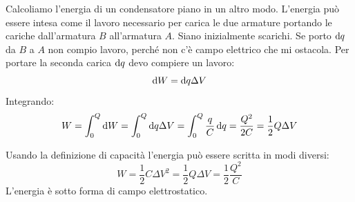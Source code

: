 \begin{Es}
Calcoliamo l'energia di un condensatore piano in un altro modo. L'energia può essere intesa come il lavoro necessario per carica le due armature portando le cariche dall'armatura $B$ all'armatura $A$. Siano inizialmente scarichi. Se porto $\mathrm{d} q$ da $B$ a $A$ non compio lavoro, perché non c'è campo elettrico che mi ostacola. Per portare la seconda carica $\mathrm{d} q$ devo compiere un lavoro:
\begin{equation*}\mathrm{d} W=\mathrm{d} q\Delta V\end{equation*}
Integrando:
\begin{equation*}W=\int_0^Q\mathrm{d} W=\int_0^Q\mathrm{d} q\Delta V=\int_0^Q\frac{q}{C}\,\mathrm{d} q=\frac{Q^2}{2C}=\frac{1}{2}Q\Delta V\end{equation*}
\end{Es}

Usando la definizione di capacità l'energia può essere scritta in modi diversi:
\begin{equation}
W=\frac{1}{2}C\Delta V^2=\frac{1}{2}Q\Delta V=\frac{1}{2}\frac{Q^2}{C}
\end{equation}
L'energia è sotto forma di campo elettrostatico.


